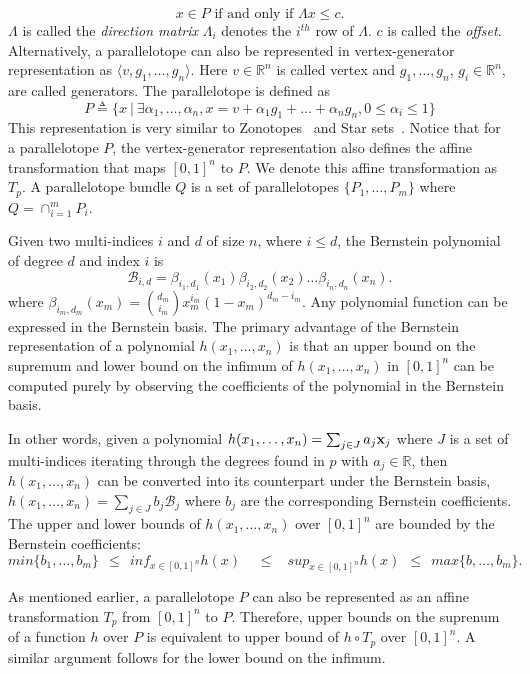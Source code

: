 \documentclass[EPiC]{easychair}
\begin{document}
$$
x \in P \mbox{ if and only if } \Lambda x \leq c.
$$
$\Lambda$ is called the \emph{direction matrix} $\Lambda_i$ denotes the $i^{th}$ row of $\Lambda$. $c$ is called the \emph{offset}. 
%
Alternatively, a parallelotope can also be represented in vertex-generator representation as $\langle v, g_1, \ldots, g_n\rangle$. Here $v \in \mathbb{R}^n$ is called vertex and $g_1, \ldots, g_n$, $g_i \in \mathbb{R}^n$, are called generators. The parallelotope is defined as
$$
P \triangleq \{ x ~|~ \exists \alpha_1, \ldots, \alpha_n, x = v + \alpha_1 g_1 + \ldots + \alpha_n g_n, 0 \leq \alpha_i \leq 1\}
$$
This representation is very similar to Zonotopes~\cite{girard2005reachability,althoff2010computing} and Star sets~\cite{duggirala2016parsimonious}. 
%
Notice that for a parallelotope $P$, the vertex-generator representation also defines the affine transformation that maps $[0,1]^{n}$ to $P$. 
%
We denote this affine transformation as $T_{p}$. 
%
A parallelotope bundle $Q$ is a set of parallelotopes $\{P_1, \ldots, P_m\}$ where $Q = \cap_{i=1}^{m}P_i$.

Given two multi-indices $i$ and $d$ of size $n$, where $i \leq d$, the Bernstein polynomial of degree $d$ and index $i$ is 
$$
\mathcal{B}_{i,d} = \beta_{i_1,d_1}(x_1) \beta_{i_2,d_2}(x_2)\ldots \beta_{i_n,d_n}(x_n).
$$
%
where $\beta_{i_m,d_m}(x_m) = \binom{d_m}{i_m}x_{m}^{i_m}(1-x_m)^{d_m - i_m}$. 
%
Any polynomial function can be expressed in the Bernstein basis. 
%
The primary advantage of the Bernstein representation of a polynomial $h(x_1,...,x_n)$ is that an upper bound on the supremum and lower bound on the infimum of $h(x_1,...,x_n)$ in $[0,1]^{n}$ can be computed purely by observing the coefficients of the polynomial in the Bernstein basis.

In other words, given a polynomial $h(x_1,\ldots,x_n) = \sum_{j \in J} a_j {\bf x}_{j}$ where $J$ is a set of multi-indices iterating through the degrees found in $p$ with $a_j \in \mathbb{R}$, then $h(x_1,\ldots,x_n)$ can be converted into its counterpart under the Bernstein basis, $h(x_1,\ldots,x_n) = \sum_{j \in J} b_j \mathcal{B}_j $ where $b_j$ are the corresponding Bernstein coefficients. 
%
The upper and lower bounds of $h(x_1,\ldots,x_n)$ over $[0,1]^n$ are bounded by the Bernstein coefficients:
$$
min \{b_1, \ldots, b_m\} ~~\leq~~ inf_{x \in [0,1]^n} h(x) ~~~~~\leq~~~~ sup_{x \in [0,1]^{n}} h(x) ~~\leq~~ max \{b, \ldots, b_m\}.
$$

As mentioned earlier, a parallelotope $P$ can also be represented as an affine transformation $T_{p}$ from $[0,1]^{n}$ to $P$. 
%
Therefore, upper bounds on the suprenum of a function $h$ over $P$ is equivalent to upper bound of $h \circ T_{p}$ over $[0,1]^{n}$.
%
A similar argument follows for the lower bound on the infimum.
%
\end{document}
